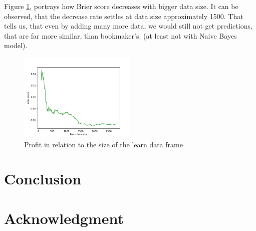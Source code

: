 \documentclass[conference]{IEEEtran}
\begin{document}
Figure \ref{data_size_brier}, portrays how Brier score decreases with bigger data size. It
can be observed, that the decrease rate settles at data size approximately 1500. That tells us,
that even by adding many more data, we would still not get predictions, that are far more similar,
than bookmaker's. (at least not with Naive Bayes model).

\begin{figure}[!ht]
\includegraphics[width=0.5\textwidth]{brier-data_size.png}
\caption{Profit in relation to the size of the learn data frame}
\label{data_size_brier}
\end{figure}

\section{Conclusion}

\section*{Acknowledgment}


 
\end{document}
